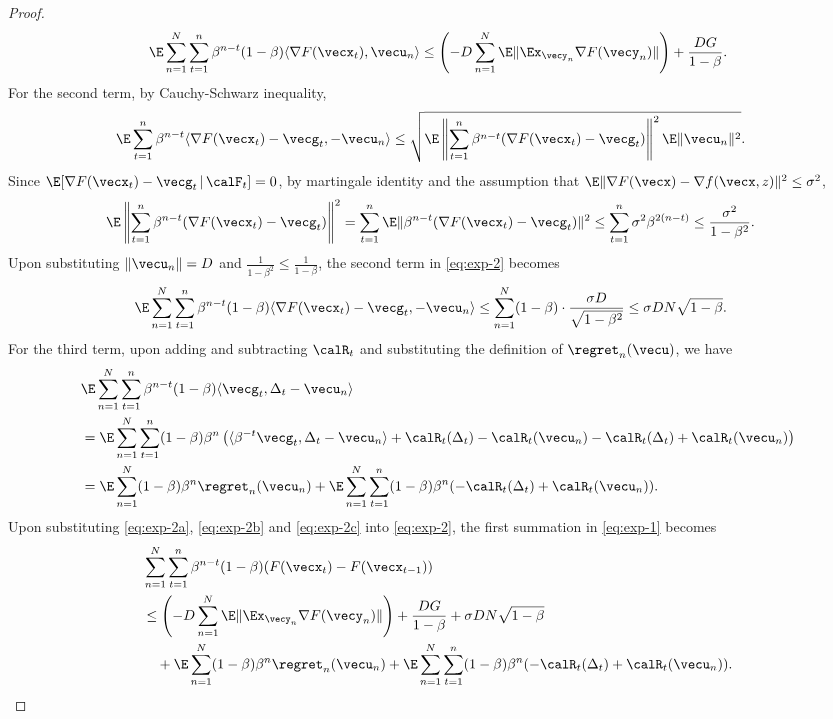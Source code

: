 \begin{proof}
\begin{align}
    \E\sum_{n=1}^N\sum_{t=1}^n \beta^{n-t}(1-\beta) \langle \nabla F(\vecx_t), \vecu_n\rangle 
    \le \left(-D\sum_{n=1}^N \E \|\Ex_{\vecy_n} \nabla F(\vecy_n)\| \right) + \frac{DG}{1-\beta}.
    \label{eq:exp-2a}
\end{align}
For the second term, by Cauchy-Schwarz inequality,
\begin{align*}
    \E \sum_{t=1}^n \beta^{n-t} \langle \nabla F(\vecx_t)-\vecg_t, -\vecu_n\rangle 
    &\le \sqrt{\E \left\| \sum_{t=1}^n \beta^{n-t}(\nabla F(\vecx_t)-\vecg_t) \right\|^2 \E\|\vecu_n\|^2}.
\end{align*}
Since $\E[\nabla F(\vecx_t)-\vecg_t \,|\, \calF_t] = 0$, by martingale identity and the assumption that $\E\|\nabla F(\vecx)-\nabla f(\vecx,z)\|^2 \le\sigma^2$,
\begin{align*}
    \E \left\| \sum_{t=1}^n \beta^{n-t}(\nabla F(\vecx_t)-\vecg_t) \right\|^2
    = \sum_{t=1}^n \E\|\beta^{n-t}(\nabla F(\vecx_t)-\vecg_t)\|^2 
    &\le \sum_{t=1}^n \sigma^2 \beta^{2(n-t)}
    \le \frac{\sigma^2}{1-\beta^2}.
\end{align*}
Upon substituting $\|\vecu_n\|=D$ and $\frac{1}{1-\beta^2}\le \frac{1}{1-\beta}$, the second term in \eqref{eq:exp-2} becomes
\begin{align}
    \E\sum_{n=1}^N\sum_{t=1}^n \beta^{n-t}(1-\beta) \langle \nabla F(\vecx_t) - \vecg_t, -\vecu_n\rangle 
    &\le \sum_{n=1}^N (1-\beta) \cdot \frac{\sigma D}{\sqrt{1-\beta^2}}
    \le \sigma DN\sqrt{1-\beta}.
    \label{eq:exp-2b}
\end{align}
For the third term, upon adding and subtracting $\calR_t$ and substituting the definition of $\regret_n(\vecu)$, we have
\begin{align}
    &\E\sum_{n=1}^N\sum_{t=1}^n \beta^{n-t}(1-\beta) \langle \vecg_t,\Delta_t-\vecu_n\rangle \notag\\
    &= \E\sum_{n=1}^N\sum_{t=1}^n (1-\beta)\beta^n \left( \langle \beta^{-t}\vecg_t,\Delta_t-\vecu_n\rangle + \calR_t(\Delta_t) - \calR_t(\vecu_n) - \calR_t(\Delta_t)+\calR_t(\vecu_n) \right) \notag\\
    &= \E\sum_{n=1}^N (1-\beta)\beta^n \regret_n(\vecu_n) + \E\sum_{n=1}^N\sum_{t=1}^n (1-\beta)\beta^n ( -\calR_t(\Delta_t) + \calR_t(\vecu_n)).
    \label{eq:exp-2c}
\end{align}
Upon substituting \eqref{eq:exp-2a}, \eqref{eq:exp-2b} and \eqref{eq:exp-2c} into \eqref{eq:exp-2}, the first summation in \eqref{eq:exp-1} becomes
\begin{align}
    &\sum_{n=1}^N\sum_{t=1}^n \beta^{n-t}(1-\beta)(F(\vecx_t)-F(\vecx_{t-1})) \notag\\
    &\le \left(-D\sum_{n=1}^N \E \|\Ex_{\vecy_n} \nabla F(\vecy_n)\| \right) + \frac{DG}{1-\beta} + \sigma DN\sqrt{1-\beta} \notag\\
    &\quad + \E\sum_{n=1}^N (1-\beta)\beta^n \regret_n(\vecu_n) + \E\sum_{n=1}^N\sum_{t=1}^n (1-\beta)\beta^n ( -\calR_t(\Delta_t) + \calR_t(\vecu_n)).
    \label{eq:exp-2d}
\end{align}


\end{proof}
